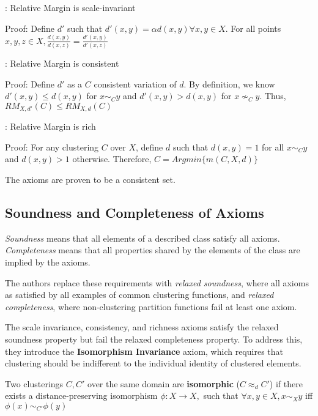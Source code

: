 \begin{lemma}: Relative Margin is scale-invariant
\end{lemma}

Proof: Define $d'$ such that $d'(x,y)=\alpha d(x,y) \forall x,y\in X$. For all points $x,y,z\in X, \frac{d(x,y)}{d(x,z)}=\frac{d'(x,y)}{d'(x,z)}$

\begin{lemma}: Relative Margin is consistent
\end{lemma}

Proof: Define $d'$ as a $C$ consistent variation of $d$. By definition, we know $d'(x,y)\leq d(x,y)$ for $x\sim_{C} y$ and $d'(x,y)>d(x,y)$ for $x \nsim_C y$. Thus, $RM_{X,d'}(C)\leq RM_{X,d}(C)$

\begin{lemma}: Relative Margin is rich

Proof: For any clustering $C$ over $X$, define $d$ such that $d(x,y)=1$ for all $x\sim_C y$ and $d(x,y)>1$ otherwise. Therefore, $C=Argmin\{m(C,X,d)\}$

\end{lemma}

The axioms are proven to be a consistent set.

\subsection*{Soundness and Completeness of Axioms}

\textit{Soundness} means that all elements of a described class satisfy all axioms. \textit{Completeness} means that all properties shared by the elements of the class are implied by the axioms. 

\medskip

The authors replace these requirements with \textit{relaxed soundness}, where all axioms as satisfied by all examples of common clustering functions, and \textit{relaxed completeness}, where non-clustering partition functions fail at least one axiom. 

The scale invariance, consistency, and richness axioms satisfy the relaxed soundness property but fail the relaxed completeness property. To address this, they introduce the \textbf{Isomorphism Invariance} axiom, which requires that clustering should be indifferent to the individual identity of clustered elements. 

\medskip

Two clusterings $C,C'$ over the same domain are \textbf{isomorphic} ($C\approx_d C'$) if there exists a distance-preserving isomorphism $\phi :X\rightarrow X,$ such that $\forall x,y\in X, x\sim_X y$ iff $\phi (x)\sim_{C'}\phi (y)$


